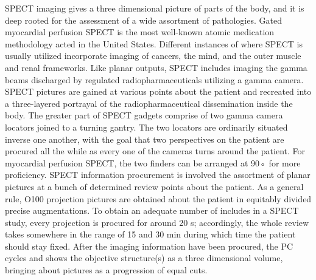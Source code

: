 \documentclass[12pt]{article}
\begin{document}
\par
SPECT imaging gives a three dimensional picture of parts of the body, and it is deep rooted for the assessment of a wide assortment of pathologies. Gated myocardial perfusion SPECT is the most well-known atomic medication methodology acted in the United States. Different instances of where SPECT is usually utilized incorporate imaging of cancers, the mind, and the outer muscle and renal frameworks.
Like planar outputs, SPECT includes imaging the gamma beams discharged by regulated radiopharmaceuticals utilizing a gamma camera. SPECT pictures are gained at various points about the patient and recreated into a three-layered portrayal of the radiopharmaceutical dissemination inside the body. The greater part of SPECT gadgets comprise of two gamma camera locators joined to a turning gantry. The two locators are ordinarily situated inverse one another, with the goal that two perspectives on the patient are procured all the while as every one of the cameras turns around the patient. For myocardial perfusion SPECT, the two finders can be arranged at 90◦ for more proficiency. SPECT information procurement is involved the assortment of planar pictures at a bunch of determined review points about the patient. As a general rule, O100 projection pictures are obtained about the patient in equitably divided precise augmentations. To obtain an adequate number of includes in a SPECT study, every projection is procured for around 20 s; accordingly, the whole review takes somewhere in the range of 15 and 30 min during which time the patient should stay fixed. After the imaging information have been procured, the PC cycles and shows the objective structure(s) as a three dimensional volume, bringing about pictures as a progression of equal cuts.
\end{document}
